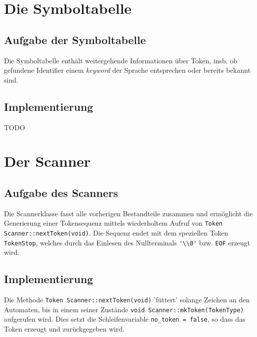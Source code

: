 \documentclass[
a4paper,   %
11pt,      %
oneside,   %
onecolumn, %
final      %
]{article}
\newcommand{\code}[1]{\lstinline$#1$}
\begin{document}
\section{Die Symboltabelle}

\subsection{Aufgabe der Symboltabelle}
Die Symboltabelle enthält weitergehende Informationen über Token, insb. ob gefundene Identifier einem \emph{keyword} der Sprache entsprechen oder bereits bekannt sind.

\subsection{Implementierung}
TODO





\section{Der Scanner}

\subsection{Aufgabe des Scanners}
Die Scannerklasse fasst alle vorherigen Bestandteile zusammen und ermöglicht die Generierung einer Tokensequenz mittels wiederholtem Aufruf von \code{Token Scanner::nextToken(void)}. Die Sequenz endet mit dem speziellen Token \texttt{TokenStop}, welches durch das Einlesen des Nullterminals \code{'\\0'} bzw. \texttt{EOF} erzeugt wird.


\subsection{Implementierung}
Die Methode \code{Token Scanner::nextToken(void)} 'füttert' solange Zeichen an den Automaten, bis in einem seiner Zustände \code{void Scanner::mkToken(TokenType)} aufgerufen wird.
Dies setzt die Schleifenvariable \code{no_token = false}, so dass das Token erzeugt und zurückgegeben wird.
\end{document}

